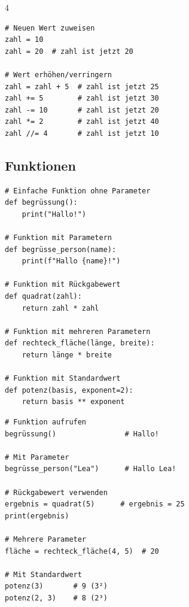 \begin{landscape}
\begin{multicols*}{4}
		\begin{cheatSheetBox}[title=Wert verändern]
			\begin{lstlisting}
# Neuen Wert zuweisen
zahl = 10
zahl = 20  # zahl ist jetzt 20

# Wert erhöhen/verringern
zahl = zahl + 5  # zahl ist jetzt 25
zahl += 5        # zahl ist jetzt 30
zahl -= 10       # zahl ist jetzt 20
zahl *= 2        # zahl ist jetzt 40
zahl //= 4       # zahl ist jetzt 10
\end{lstlisting}
		\end{cheatSheetBox}

		\columnbreak\textcolor{\cheatSheetColor}{\subsection*{Funktionen}}

		\begin{cheatSheetBox}[title=Funktionen definieren]
			\begin{lstlisting}
# Einfache Funktion ohne Parameter
def begrüssung():
    print("Hallo!")

# Funktion mit Parametern
def begrüsse_person(name):
    print(f"Hallo {name}!")

# Funktion mit Rückgabewert
def quadrat(zahl):
    return zahl * zahl

# Funktion mit mehreren Parametern
def rechteck_fläche(länge, breite):
    return länge * breite

# Funktion mit Standardwert
def potenz(basis, exponent=2):
    return basis ** exponent
\end{lstlisting}
		\end{cheatSheetBox}

		\begin{cheatSheetBox}[title=Funktionen aufrufen]
			\begin{lstlisting}
# Funktion aufrufen
begrüssung()                # Hallo!

# Mit Parameter
begrüsse_person("Lea")      # Hallo Lea!

# Rückgabewert verwenden
ergebnis = quadrat(5)      # ergebnis = 25
print(ergebnis)

# Mehrere Parameter
fläche = rechteck_fläche(4, 5)  # 20

# Mit Standardwert
potenz(3)       # 9 (3²)
potenz(2, 3)    # 8 (2³)
\end{lstlisting}
		\end{cheatSheetBox}


\end{multicols*}
\end{landscape}

